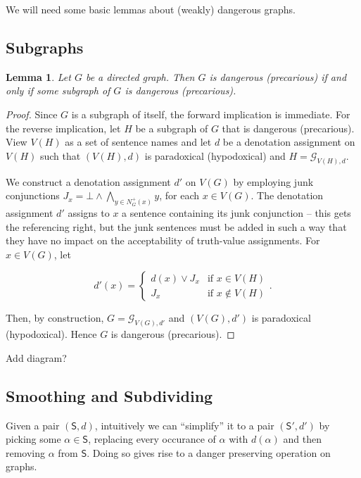 \documentclass[12pt]{article}
\newtheorem{lem}[thm]{Lemma}
\theoremstyle{remark}
\newcommand{\fancy}[1]{\mathcal{#1}}
\def\S{\textsf{S}}
\def\G{\fancy{G}}
\begin{document}
We will need some basic lemmas about (weakly) dangerous graphs.

\subsection{Subgraphs}

\begin{lem}\label{SubgraphDangerLemma}
Let $G$ be a directed graph.  Then $G$ is dangerous (precarious) if and only if some subgraph of $G$ is dangerous (precarious).
\end{lem}
\begin{proof}
Since $G$ is a subgraph of itself, the forward implication is immediate.  For the reverse implication, let $H$ be a subgraph of $G$ that is dangerous (precarious).  View $V(H)$ as a set of sentence names and let $d$ be a denotation assignment on $V(H)$ such that $(V(H), d)$ is paradoxical (hypodoxical) and
$H = \G_{V(H), d}$. \newline 

We construct a denotation assignment $d'$ on $V(G)$ by employing junk conjunctions $J_x = \bot \wedge \bigwedge_{y \in N^{+}_G(x)} y$, for each $x \in V(G)$. The denotation assignment $d'$ assigns to $x$ a sentence containing its junk conjunction -- this gets the referencing right, but the junk sentences must be added in such a way that they have no impact on the acceptability of truth-value assignments. For $x \in V(G)$, let

\[d'(x) = \begin{cases}
d(x) \vee J_x & \text{if } x \in V(H) \\
J_x & \text{if } x \not \in V(H)
\end{cases}.\]

Then, by construction, $G = \G_{V(G), d'}$ and $(V(G), d')$ is paradoxical (hypodoxical).  Hence $G$ is dangerous (precarious).
\end{proof}

Add diagram?

\subsection{Smoothing and Subdividing}

Given a pair $(\S, d)$, intuitively we can ``simplify'' it to a pair $(\S', d')$ by picking some $\alpha \in \S$, replacing every occurance of $\alpha$ with $d(\alpha)$ and then removing $\alpha$ from $\S$.  Doing so gives rise to a danger preserving operation on graphs.  
\end{document}
